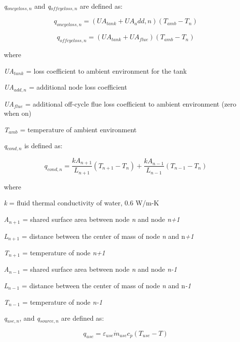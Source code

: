 \emph{q\(_{oncycloss,n}\)} and \emph{q\(_{offcycloss,n}\)} are defined as:

\begin{equation}
{q_{oncycloss,n}} = ({UA_{tank}} + UA_add,n)({T_{amb}} - {T_n})
\end{equation}

\begin{equation}
{q_{offcycloss,n}} = ({UA_{tank} + UA_{flue}})({T_{amb}} - {T_n})
\end{equation}

where

\emph{UA\(_{tank}\)} = loss coefficient to ambient environment for the tank

\emph{UA\(_{add,n}\)} = additional node loss coefficient

\emph{UA\(_{flue}\)} = additional off-cycle flue loss coefficient to ambient environment (zero when on)

\emph{T\(_{amb}\)} = temperature of ambient environment

\emph{q\(_{cond,n}\)} is defined as:

\begin{equation}
{q_{cond,n}} = \frac{{k{A_{n + 1}}}}{{{L_{n + 1}}}}({T_{n + 1}} - {T_n}) + \frac{{k{A_{n - 1}}}}{{{L_{n - 1}}}}({T_{n - 1}} - {T_n})
\end{equation}

where

\emph{k} = fluid thermal conductivity of water, 0.6 W/m-K

\emph{A\(_{n+1}\)} = shared surface area between node \emph{n} and node \emph{n+1}

\emph{L\(_{n+1}\)} = distance between the center of mass of node \emph{n} and n\emph{+1}

\emph{T\(_{n+1}\)} = temperature of node \emph{n+1}

\emph{A\(_{n-1}\)} = shared surface area between node \emph{n} and node \emph{n-1}

\emph{L\(_{n-1}\)} = distance between the center of mass of node \emph{n} and n\emph{-1}

\emph{T\(_{n-1}\)} = temperature of node \emph{n-1}

\emph{q\(_{use,n}\)}, and \emph{q\(_{source,n}\)} are defined as:

\begin{equation}
{q_{use}} = {\varepsilon_{use}}{\dot m_{use}}{c_p}\left( {{T_{use}} - T} \right)
\end{equation}

